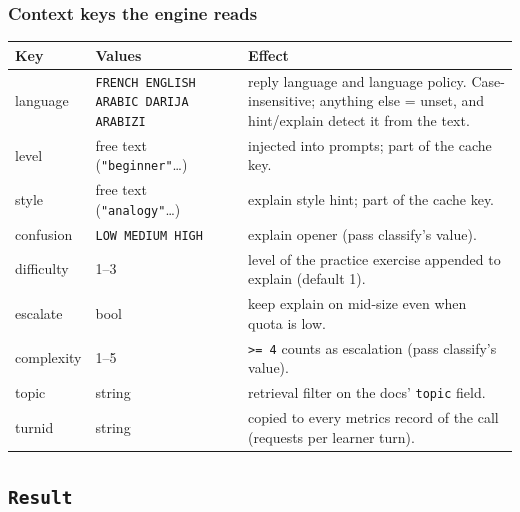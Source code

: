 \documentclass[11pt,a4paper]{article}
\renewcommand{\_}{\origus\allowbreak}
\begin{document}
\subsubsection*{Context keys the engine reads}

\begin{tabularx}{\linewidth}{@{}T{2.4cm} L{4.6cm} Y@{}}
\toprule
\textrm{\textbf{Key}} & \textbf{Values} & \textbf{Effect}\\
\midrule
language & \texttt{FRENCH ENGLISH ARABIC DARIJA ARABIZI} & reply language and language policy. Case-insensitive; anything else = unset, and hint/explain detect it from the text.\\
level & free text (\texttt{"beginner"}\dots) & injected into prompts; part of the cache key.\\
style & free text (\texttt{"analogy"}\dots) & explain style hint; part of the cache key.\\
confusion & \texttt{LOW MEDIUM HIGH} & explain opener (pass classify's value).\\
difficulty & 1–3 & level of the practice exercise appended to explain (default 1).\\
escalate & bool & keep explain on mid-size even when quota is low.\\
complexity & 1–5 & \texttt{>= 4} counts as escalation (pass classify's value).\\
topic & string & retrieval filter on the docs' \texttt{topic} field.\\
turn\_id & string & copied to every metrics record of the call (requests per learner turn).\\
\bottomrule
\end{tabularx}

\subsection{\texttt{Result}}
\end{document}
